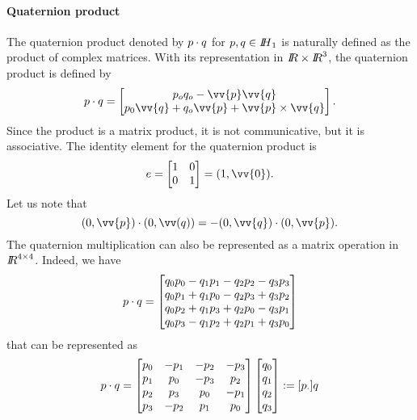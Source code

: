 \paragraph{Quaternion product} The quaternion product denoted by $p \cdot q $ for $p,q\in \mbox{\rm $I\!\!H$}_1$ is naturally defined as the product of complex matrices. With its representation in $\mbox{\rm $I\!\!R$}\times \mbox{\rm $I\!\!R$}^3$, the quaternion product is defined by
\begin{equation}
  \label{eq:73}
  p \glaw q =
  \begin{bmatrix}
    p_oq_o - \vv{p}\vv{q} \\
    p_0\vv{q}+q_o\vv{p} + \vv{p}\times\vv{q}
  \end{bmatrix}.
\end{equation}
Since the product is a matrix product, it is not communicative, but it is associative.  The identity element for the quaternion product is 
\begin{equation}
e=  \begin{bmatrix}
    1 & 0 \\
    0 & 1  \\
  \end{bmatrix} =(1,\vv{0})\label{eq:57}.
\end{equation}Let us note that 
\begin{equation}
  \label{eq:74}
  (0,\vv{p})\glaw (0,\vv(q)) = - (0,\vv{q})\glaw (0,\vv{p}).
\end{equation}
The quaternion multiplication can also be represented as a matrix operation in $\mbox{\rm $I\!\!R$}^{4\times4}$. Indeed, we have
\begin{equation}
  \label{eq:75}
  p \cdot q  =
  \begin{bmatrix}
    q_0 p_0 -q_1p_1-q_2p_2-q_3p_3\\
    q_0 p_1 +q_1p_0-q_2p_3+q_3p_2\\
    q_0 p_2 +q_1p_3+q_2p_0-q_3p_1\\
    q_0 p_3 -q_1p_2+q_2p_1+q_3p_0\\
  \end{bmatrix}
\end{equation}
that can be represented as
\begin{equation}
  \label{eq:76}
  p \cdot q  =
  \begin{bmatrix}
    p_0 & -p_1 & -p_2 & -p_3 \\
    p_1 & p_0 & -p_3 & p_2 \\
    p_2 & p_3 & p_0 & -p_1 \\
    p_3 & -p_2 & p_1 & p_0 \\
  \end{bmatrix}
  \begin{bmatrix}
    q_0\\
    q_1\\
    q_2\\
    q_3
  \end{bmatrix} := [p_\cdot]q
\end{equation}
